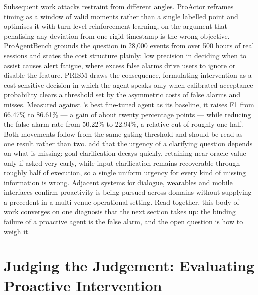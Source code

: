 Subsequent work attacks restraint from different angles. ProActor
\citep[an unrefereed conference submission]{ding_proactor_2026} reframes timing
as a window of valid moments rather than a single labelled point and optimises
it with turn-level reinforcement learning, on the argument that penalising any
deviation from one rigid timestamp is the wrong objective. ProAgentBench
\citep[a 2026 preprint]{tang_proagentbench_2026} grounds the question in 28,000
events from over 500 hours of real sessions and states the cost structure
plainly: low precision in deciding when to assist causes alert fatigue, where
excess false alarms drive users to ignore or disable the feature. PRISM
\citep[a 2026 preprint]{fu_prism_2026} draws the consequence, formulating
intervention as a cost-sensitive decision in which the agent speaks only when
calibrated acceptance probability clears a threshold set by the asymmetric
costs of false alarms and misses. Measured against
\citeauthor{lu_proactive_2024}'s best fine-tuned agent as its baseline, it
raises F1 from 66.47\% to 86.61\% --- a gain of about twenty percentage points
--- while reducing the false-alarm rate from 50.22\% to 22.94\%, a relative cut
of roughly one half. Both movements follow from the same gating threshold and
should be read as one result rather than two.
\citet[a 2026 preprint]{gulati_ask_2026} add that the urgency of a clarifying
question depends on what is missing: goal clarification decays quickly,
retaining near-oracle value only if asked very early, while input clarification
remains recoverable through roughly half of execution, so a single uniform
urgency for every kind of missing information is wrong. Adjacent systems for
dialogue, wearables and mobile interfaces
\citep{liu_proactiveeval_2025,yang_contextagent_2025,yang_fingertip_2025}
confirm proactivity is being pursued across domains without supplying a
precedent in a multi-venue operational setting. Read together, this body of
work converges on one diagnosis that the next section takes up: the binding
failure of a proactive agent is the false alarm, and the open question is how
to weigh it.

\section{Judging the Judgement: Evaluating Proactive Intervention}
\label{sec:rw-evaluation}

